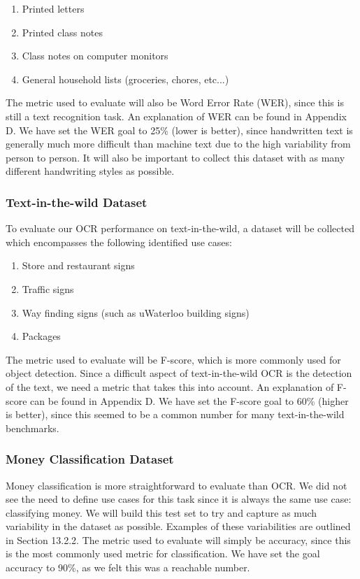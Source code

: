 \documentclass[a4paper,11pt]{article}
\begin{document}
\begin{enumerate}
    \item Printed letters
    \item Printed class notes
    \item Class notes on computer monitors
    \item General household lists (groceries, chores, etc...)
\end{enumerate}

The metric used to evaluate will also be Word Error Rate (WER), since this is still a text recognition task. An explanation of WER can be found in Appendix D. We have set the WER goal to 25\% (lower is better), since handwritten text is generally much more difficult than machine text due to the high variability from person to person. It will also be important to collect this dataset with as many different handwriting styles as possible.

\subsubsection{Text-in-the-wild Dataset}
To evaluate our OCR performance on text-in-the-wild, a dataset will be collected which encompasses the following identified use cases:

\begin{enumerate}
    \item Store and restaurant signs
    \item Traffic signs
    \item Way finding signs (such as uWaterloo building signs)
    \item Packages
\end{enumerate}

The metric used to evaluate will be F-score, which is more commonly used for object detection. Since a difficult aspect of text-in-the-wild OCR is the detection of the text, we need a metric that takes this into account. An explanation of F-score can be found in Appendix D. We have set the F-score goal to 60\% (higher is better), since this seemed to be a common number for many text-in-the-wild benchmarks.

\subsubsection{Money Classification Dataset}
Money classification is more straightforward to evaluate than OCR. We did not see the need to define use cases for this task since it is always the same use case: classifying money. We will build this test set to try and capture as much variability in the dataset as possible. Examples of these variabilities are outlined in Section 13.2.2. The metric used to evaluate will simply be accuracy, since this is the most commonly used metric for classification. We have set the goal accuracy to 90\%, as we felt this was a reachable number.
\end{document}
